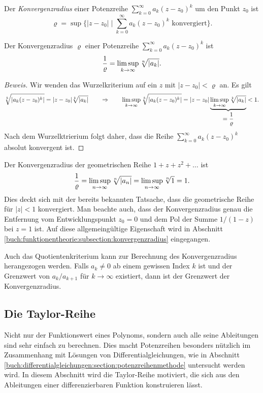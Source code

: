 \begin{definition}
\label{buch:polynome:definition:konvergenzradius}
%
Der {\em Konvergenzradius} einer Potenzreihe $\sum_{k=0}^\infty a_k(z-z_0)^k$
um den Punkt $z_0$ ist 
\[
\varrho = \sup \biggl\{ |z-z_0|\;\bigg|\;
\text{$\displaystyle\sum_{k=0}^\infty a_k(z-z_0)^k$ konvergiert}
\biggr\}.
\]
\end{definition}

\begin{satz}
\label{buch:polynome:satz:konvergenzradius}
Der Konvergenzradius $\varrho$ einer Potenzreihe
$\sum_{k=0}^\infty a_k(z-z_0)^k$ ist
\begin{equation}
\frac{1}{\varrho}
=
\limsup_{k\to\infty} \root{n}\of{|a_k|}.
\label{buch:polynome:eqn:konvergenzradius}
\end{equation}
\end{satz}

\begin{proof}[Beweis]
Wir wenden das Wurzelkriterium auf ein $z$ mit $|z-z_0|<\varrho$ an.
Es gilt
\[
\root{k}\of{|a_k(z-z_0)^k|}
=
|z-z_0|\root{k}\of{|a_k|}
\qquad
\Rightarrow
\qquad
\limsup_{k\to\infty}\root{k}\of{|a_k(z-z_0)^k|}
=
|z-z_0| \underbrace{\limsup_{k\to\infty}\root{k}\of{|a_k|}}_{\displaystyle=\frac{1}{\varrho}}
<
1.
\]
Nach dem Wurzelktrierium folgt daher, dass die Reihe
$\sum_{k=0}^\infty a_k(z-z_0)^k$ absolut konvergent ist.
\end{proof}

\begin{beispiel}
Der Konvergenzradius der geometrischen Reihe $1+z+z^2+\dots$ ist
\[
\frac{1}{\varrho}
=
\limsup_{n\to\infty} \root{n}\of{|a_n|}
=
\limsup_{n\to\infty} \root{n}\of{1}
=
1.
\]
Dies deckt sich mit der bereits bekannten Tatsache, dass die 
geometrische Reihe für $|z|<1$ konvergiert.
Man beachte auch, dass der Konvergenzradius genau die Entfernung
vom Entwicklungspunkt $z_0=0$ und dem Pol der Summe $1/(1-z)$ bei
$z=1$ ist.
Auf diese allgemeingültige Eigenschaft wird in Abschnitt
\ref{buch:funktionentheorie:subsection:konvergenzradius}
eingegangen.
\end{beispiel}

Auch das Quotientenkriterium kann zur Berechnung des Konvergenzradius
herangezogen werden.
Falls $a_k\ne 0$ ab einem gewissen Index $k$ ist und der Grenzwert
von $a_{k}/a_{k+1}$ für $k\to\infty$ existiert, dann ist der
Grenzwert der Konvergenzradius.

%
%
\subsection{Die Taylor-Reihe
\label{buch:polynome:subsection:taylor-reihe}}
Nicht nur der Funktionswert eines Polynoms, sondern auch alle
seine Ableitungen sind sehr einfach zu berechnen.
Dies macht Potenzreihen besonders nützlich im Zusammenhang
mit Lösungen von Differentialgleichungen, wie in Abschnitt
\ref{buch:differentialgleichungen:section:potenzreihenmethode}
untersucht werden wird.
In diesem Abschnitt wird die Taylor-Reihe motiviert, die sich
aus den Ableitungen einer differenzierbaren Funktion konstruieren
lässt.

